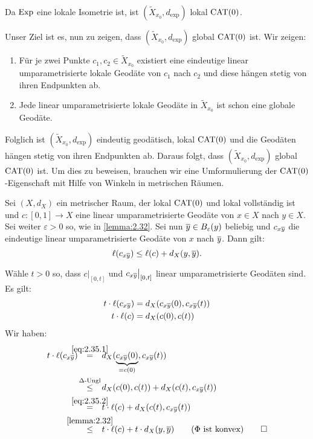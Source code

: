\begin{bemerkung}
\label{bem:2.34}
	Da $\operatorname{Exp}$ eine lokale Isometrie ist, ist $(\tilde{X}_{x_0},d_{\exp})$ lokal $\operatorname{CAT(0)}$.
\end{bemerkung}

Unser Ziel ist es, nun zu zeigen, dass $(\tilde{X}_{x_0},d_{\exp})$ global $\operatorname{CAT(0)}$ ist.
Wir zeigen:
\begin{enumerate}[(1)]
	\item Für je zwei Punkte $c_1,c_2 \in \tilde{X}_{x_0}$ existiert eine eindeutige linear umparametrisierte lokale Geodäte von $c_1$ nach $c_2$ und diese hängen stetig von ihren Endpunkten ab.
	\item Jede linear umparametrisierte lokale Geodäte in $\tilde{X}_{x_0}$ ist schon eine globale Geodäte.
\end{enumerate}
Folglich ist $(\tilde{X}_{x_0},d_{\exp})$ eindeutig geodätisch, lokal $\operatorname{CAT(0)}$ und die Geodäten hängen stetig von ihren Endpunkten ab.
Daraus folgt, dass $(\tilde{X}_{x_0},d_{\exp})$ global $\operatorname{CAT(0)}$ ist.
Um dies zu beweisen, brauchen wir eine Umformulierung der $\operatorname{CAT(0)}$-Eigenschaft mit Hilfe von Winkeln in metrischen Räumen.

\begin{korollar}
\label{kor:2.35}
	Sei $(X,d_X)$ ein metrischer Raum, der lokal $\operatorname{CAT(0)}$ und lokal vollständig ist und $c \colon [0,1] \rightarrow X$ eine linear umparametrisierte Geodäte von $x \in X$ nach $y \in X$.
	Sei weiter $\varepsilon > 0$ so, wie in \autoref{lemma:2.32}.
	Sei nun $\overline{y} \in B_\varepsilon(y)$ beliebig und $c_{x \overline{y}}$ die eindeutige linear umparametrisierte Geodäte von $x$ nach $\overline{y}$.
	Dann gilt: 
	\[
		\ell(c_{x \overline{y}}) \leq \ell(c) + d_X(y,\overline{y}).
	\]
\end{korollar}

\begin{beweis}
	Wähle $t > 0$ so, dass $c\big|_{[0,t]}$ und $c_{x \overline{y}} \big|_{[0,t]}$ linear umparametrisierte Geodäten sind.
	Es gilt:
	\begin{align}
		t \cdot \ell(c_{x \overline{y}}) &= d_X(c_{x \overline{y}}(0),c_{x \overline{y}}(t)) \label{eq:2.35.1} \\
		t \cdot \ell(c) &= d_X(c(0),c(t)) \label{eq:2.35.2}
	\end{align}
	Wir haben:
	\begin{align*}
		t \cdot \ell(c_{x \ol{y}}) &\stack{\eqref{eq:2.35.1}}{=} d_X(\Underbrace{c_{x \ol{y}}(0)}{=c(0)},c_{x \ol{y}}(t)) \\
		&\stack{\Delta\text{-Ungl}}{\leq} d_X(c(0),c(t)) + d_X(c(t),c_{x \ol{y}}(t)) \\
		&\stack{\eqref{eq:2.35.2}}{=} t \cdot \ell(c) + d_X(c(t),c_{x \ol{y}}(t)) \\
		&\stack{\ref{lemma:2.32}}{\leq} t \cdot \ell(c) + t \cdot d_X(y,\ol{y}) \qquad (\Phi \text{ ist konvex}) \qedhere
	\end{align*}
\end{beweis}

